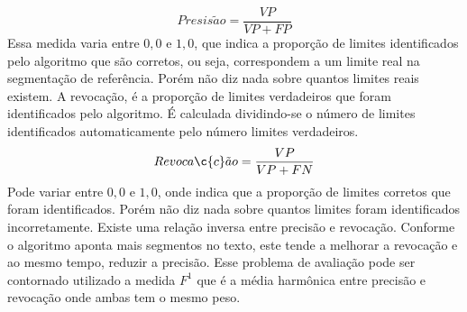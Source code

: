  \begin{equation}
	 Presis\tilde{a}o = \frac{VP}{VP+FP}
	 \label{equ:precisao}
 \end{equation}
%
 Essa medida varia entre $0,0$ e $1,0$, que indica a proporção de limites identificados pelo algoritmo que são corretos, ou seja, correspondem a um limite real na segmentação de referência. Porém não diz nada sobre quantos limites reais existem. 
%
%
%
%
 A revocação, é a proporção de limites verdadeiros que foram identificados pelo algoritmo.
%
 É calculada dividindo-se o número de limites identificados automaticamente pelo número limites verdadeiros.
%
%
% 
 \begin{equation}
	 Revoca\c{c}\tilde{a}o = \frac{VP}{VP+FN}
	 \label{equ:revocacao}
 \end{equation}
%
 Pode variar entre $0,0$ e $1,0$, onde indica que a proporção de limites corretos que foram identificados. Porém não diz nada sobre quantos limites foram identificados incorretamente. 
 Existe uma relação inversa entre precisão e revocação. Conforme o algoritmo aponta mais segmentos no texto, este tende a melhorar a revocação e ao mesmo tempo, reduzir a precisão. 
%
 Esse problema de avaliação pode ser contornado utilizado a medida $F^1$ que é a média harmônica entre precisão e revocação onde ambas tem o mesmo peso. 
%






























